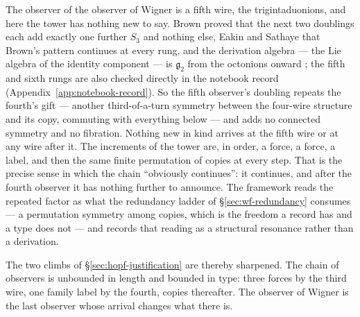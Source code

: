 The observer of the observer of Wigner is a fifth wire, the trigintaduonions,
and here the tower has nothing new to say. Brown proved that the next two
doublings each add exactly one further $S_{3}$ and nothing else, Eakin and
Sathaye that Brown's pattern continues at every rung, and the derivation
algebra --- the Lie algebra of the identity component --- is $\mathfrak{g}_{2}$
from the octonions onward
\autocite{brown1967generalized,eakinsathaye1990automorphisms,schafer1954cayleydickson};
the fifth and sixth rungs are also checked directly in the notebook record
(Appendix~\ref{app:notebook-record}). So the fifth observer's doubling repeats
the fourth's gift --- another third-of-a-turn symmetry between the four-wire
structure and its copy, commuting with everything below --- and adds no
connected symmetry and no fibration. Nothing new in kind arrives at the fifth
wire or at any wire after it. The increments of the tower are, in order, a
force, a force, a label, and then the same finite permutation of copies at
every step. That is the precise sense in which the chain ``obviously
continues'': it continues, and after the fourth observer it has nothing further
to announce. The framework reads the repeated factor as what the redundancy
ladder of \S\ref{sec:wf-redundancy} consumes --- a permutation symmetry among
copies, which is the freedom a record has and a type does not --- and records
that reading as a structural resonance rather than a derivation.

The two climbs of \S\ref{sec:hopf-justification} are thereby sharpened. The
chain of observers is unbounded in length and bounded in type: three forces by
the third wire, one family label by the fourth, copies thereafter. The observer
of Wigner is the last observer whose arrival changes what there is.

